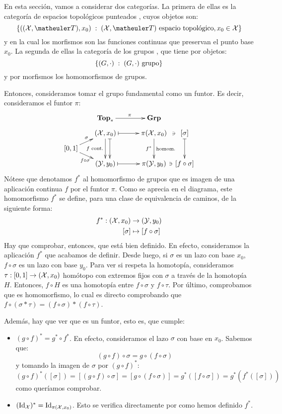 \begin{const}
	En esta sección, vamos a considerar dos categorías. La primera de ellas es la categoría de espacios topológicos punteados \Topp, cuyos objetos son: 
	\[\{((\X,\T),x_0)\midc (\X,\T)\text{ espacio topológico}, x_0\in\X\}\]
	y en la cual los morfismos son las funciones continuas que preservan el punto base $x_0$. La segunda de ellas la categoría de los grupos \Grp, que tiene por objetos:
	\[\{(G,\cdot)\;:\; (G,\cdot) \text{ grupo}\}\]
	y por morfismos los homomorfismos de grupos.
	
	Entonces, consideramos tomar el grupo fundamental como un funtor. Es decir, consideramos el funtor $\pi$:
	\[\xymatrix @R=0.5pc @C=0.5pc {
		& & \Topp \ar[rrr]^\pi & & & \Grp & \\
		& & (\X,x_0) \ar@{|->}[rrr] \ar[dd]_{f \text{ cont.}} \ar@<1.5ex>@{|->}[dd] & & & \pi(\X,x_0) \ar[dd]_{f^\ast}^{\text{homom.}} \ar@{}[r]|-\ni & [\sigma] \ar@{|->}[dd] \\
		[0,1] \ar[urr]^\sigma \ar[drr]_{f\circ\sigma} & & & & & & \\
		& & (\Y,y_0) \ar@{|->}[rrr] & & & \pi(\Y,y_0) \ar@{}[r]|-\ni & [f\circ\sigma] \\
	}\]
	Nótese que denotamos $f^\ast$ al homomorfismo de grupos que es imagen de una aplicación continua $f$ por el funtor $\pi$.
	Como se aprecia en el diagrama, este homomorfismo $f^\ast$ se define, para una clase de equivalencia de caminos, de la siguiente forma:
	\[\begin{split}
	f^\ast:(\mathcal{X}, x_0) &\to (\mathcal{Y}, y_0) \\
	[\sigma] &\mapsto [f\circ\sigma]
	\end{split}\]
	Hay que comprobar, entonces, que está bien definido. En efecto, consideramos la aplicación $f^\ast$ que acabamos de definir. Desde luego, si $\sigma$ es un lazo con base $x_0$, $f\circ\sigma$ es un lazo con base $y_0$. Para ver si respeta la homotopía, consideramos $\tau:[0,1]\to (\mathcal{X},x_0)$ homótopo con extremos fijos con $\sigma$ a través de la homotopía $H$. Entonces, $f\circ H$ es una homotopía entre $f\circ\sigma$ y $f\circ\tau$. Por último, comprobamos que es homomorfismo, lo cual es directo comprobando que $f\circ(\sigma\ast\tau)=(f\circ\sigma)\ast (f\circ\tau)$.
	
	Además, hay que ver que es un funtor, esto es, que cumple:
	\begin{itemize}
		\item $(g\circ f)^\ast = g^\ast\circ f^\ast$. En efecto, consideramos el lazo $\sigma$ con base en $x_0$. Sabemos que:
		\[(g\circ f)\circ\sigma=g\circ(f\circ\sigma)\]
		y tomando la imagen de $\sigma$ por $(g\circ f)^\ast$:
			\[(g\circ f)^\ast([\sigma])=[(g\circ f)\circ\sigma]=[g\circ(f\circ\sigma)]=g^\ast([f\circ\sigma])=g^\ast(f^\ast([\sigma]))\]
		como queríamos comprobar.
		
		\item $(\operatorname{Id}_{\mathcal{X}})^\ast = \operatorname{Id}_{\pi(\mathcal{X}, x_0)}$. Esto se verifica directamente por como hemos definido $f^\ast$.
	\end{itemize}
\end{const}

